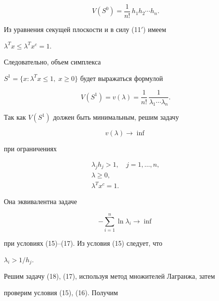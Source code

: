 \begin{equation}


V(S^0)=\frac{1}{n!}\,h_1h_2\dotsb h_n.


\end{equation}


Из уравнения секущей плоскости и в силу (11${}'$) имеем


$\lambda^Tx\le\lambda^Tx^c=1$.


Следовательно, объем симплекса


$S^1=\{x:\lambda^Tx\le 1,\;x\ge 0\}$ будет выражаться формулой


\begin{equation}


V(S^1)=v(\lambda)=\frac{1}{n!}\,


\frac{1}{\lambda_1\dotsb\lambda_n}.


\end{equation}


Так как $V(S^1)$ должен быть минимальным, решим задачу


\begin{equation}


v(\lambda)\to\inf


\end{equation}


при ограничениях


\begin{gather}


\lambda_jh_j>1,\quad j=1,\dotsc,n,\\


\lambda\ge 0,\\


\lambda^Tx^c=1.


\end{gather}


Она эквивалентна задаче


\begin{equation}


-\sum^n_{i=1}\ln\lambda_i\to \inf


\end{equation}


при условиях (15)--(17). Из условия (15) следует, что


$\lambda_i>1/h_j$.





Решим задачу (18), (17), используя метод множителей Лагранжа, затем


проверим условия (15), (16). Получим



